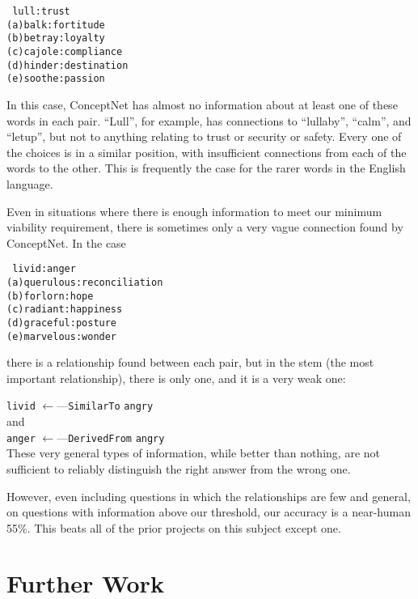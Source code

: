 \documentclass[11pt]{article}
\begin{document}
\texttt{
lull:trust\\
(a)balk:fortitude\\
(b)betray:loyalty\\
(c)cajole:compliance\\
(d)hinder:destination\\
(e)soothe:passion\\}

In this case, ConceptNet has almost no information about at least one of these words in each pair. ``Lull'', for example, has connections to ``lullaby'', ``calm'', and ``letup'', but not to anything relating to trust or security or safety. Every one of the choices is in a similar position, with insufficient connections from each of the words to the other. This is frequently the case for the rarer words in the English language.

Even in situations where there is enough information to meet our minimum viability requirement, there is sometimes only a very vague connection found by ConceptNet. In the case

\texttt{
livid:anger\\
(a)querulous:reconciliation\\
(b)forlorn:hope\\
(c)radiant:happiness\\
(d)graceful:posture\\
(e)marvelous:wonder\\}

there is a relationship found between each pair, but in the stem (the most important relationship), there is only one, and it is a very weak one:

\verb|livid| $\leftarrow$---\verb|SimilarTo| \verb|angry|\\
and\\
\verb|anger| $\leftarrow$---\verb|DerivedFrom| \verb|angry|\\

These very general types of information, while better than nothing, are not sufficient to reliably distinguish the right answer from the wrong one.

However, even including questions in which the relationships are few and general, on questions with information above our threshold, our accuracy is a near-human 55\%. This beats all of the prior projects on this subject except one.

\section{Further Work}
\end{document}
